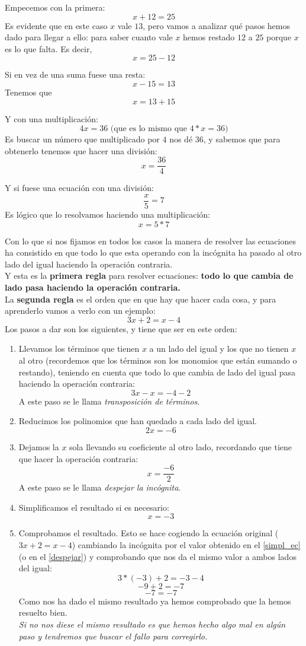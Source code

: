 \documentclass[a4paper,11pt,answers]{exam}
\begin{document}
  Empecemos con la primera:
  \[x + 12 = 25\]
  Es evidente que en este caso $x$ vale $13$, pero vamos a analizar qué pasos hemos dado para llegar a ello: para saber cuanto vale $x$ hemos restado $12$ a $25$ porque $x$ es lo que falta. Es decir,
  \[x = 25 - 12\]

  Si en vez de una suma fuese una resta:
  \[x - 15 = 13\]
  Tenemos que
  \[x = 13 + 15\]

  Y con una multiplicación:
  \[4x = 36 \text{ (que es lo mismo que } 4*x=36 \text{)}\]
  Es buscar un número que multiplicado por $4$ nos dé $36$, y sabemos que para obtenerlo tenemos que hacer una división:
  \[x = \frac{36}{4}\]

  Y si fuese una ecuación con una división:
  \[\frac{x}{5} = 7\]
  Es lógico que lo resolvamos haciendo una multiplicación:
  \[x = 5*7\]

  Con lo que si nos fijamos en todos los casos la manera de resolver las ecuaciones ha consistido en que todo lo que esta operando con la incógnita ha pasado al otro lado del igual haciendo la operación contraria.\\

  Y esta es la \textbf{primera regla} para resolver ecuaciones: \textbf{\large todo lo que cambia de lado pasa haciendo la operación contraria.}\\

  La \textbf{segunda regla} es el orden que en que hay que hacer cada cosa, y para aprenderlo vamos a verlo con un ejemplo:
  \[3x + 2 = x - 4\]
  Los pasos a dar son los siguientes, y tiene que ser en este orden:
  \begin{enumerate}[ref={paso~\arabic*}]
  \item Llevamos los términos que tienen $x$ a un lado del igual y los que no tienen $x$ al otro (recordemos que los términos son los monomios que están sumando o restando), teniendo en cuenta que todo lo que cambia de lado del igual pasa haciendo la operación contraria:
    \[3x - x = -4 - 2\]
    A este paso se le llama \emph{transposición de términos}.
  \item Reducimos los polinomios que han quedado a cada lado del igual.
    \[2x = -6\]
  \item Dejamos la $x$ sola llevando su coeficiente al otro lado, recordando que tiene que hacer la operación contraria:
    \[x = \frac{-6}{2}\]
    A este paso se le llama \emph{despejar la incógnita}. \label{despejar}
  \item Simplificamos el resultado si es necesario: \label{simpl_ec}
    \[x = -3\]
  \item Comprobamos el resultado. Esto se hace cogiendo la ecuación original ($3x + 2 = x - 4$) cambiando la incógnita por el valor obtenido en el \ref{simpl_ec} (o en el \ref{despejar}) y comprobando que nos da el mismo valor a ambos lados del igual:
    \[3*(-3) + 2 = -3 -4\]
    \[-9 + 2 = -7\]
    \[-7 = -7\]
    Como nos ha dado el mismo resultado ya hemos comprobado que la hemos resuelto bien.\\
    
    \emph{Si no nos diese el mismo resultado es que hemos hecho algo mal en algún paso y tendremos que buscar el fallo para corregirlo.}
  \end{enumerate}
\end{document}
